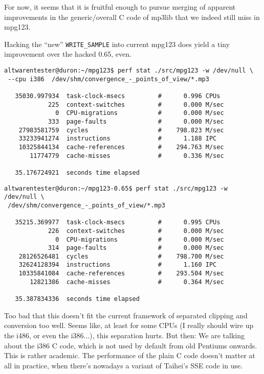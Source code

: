 \documentclass[a4paper,12pt]{scrartcl}
\begin{document}
For now, it seems that it is fruitful enough to pursue merging of apparent improvements in the generic/overall C code of mp3lib that we indeed still miss in mpg123.

Hacking the ``new'' \verb:WRITE_SAMPLE: into current mpg123 does yield a tiny improvement over the hacked 0.65, even.
\begin{verbatim}
altwarentester@duron:~/mpg123$ perf stat ./src/mpg123 -w /dev/null \
 --cpu i386  /dev/shm/convergence_-_points_of_view/*.mp3

   35030.997934  task-clock-msecs         #      0.996 CPUs
            225  context-switches         #      0.000 M/sec
              0  CPU-migrations           #      0.000 M/sec
            333  page-faults              #      0.000 M/sec
    27983581759  cycles                   #    798.823 M/sec
    33233941274  instructions             #      1.188 IPC
    10325844134  cache-references         #    294.763 M/sec
       11774779  cache-misses             #      0.336 M/sec
   
   35.176724921  seconds time elapsed
\end{verbatim}
\begin{verbatim}
altwarentester@duron:~/mpg123-0.65$ perf stat ./src/mpg123 -w /dev/null \
 /dev/shm/convergence_-_points_of_view/*.mp3

   35215.369977  task-clock-msecs         #      0.995 CPUs
            226  context-switches         #      0.000 M/sec
              0  CPU-migrations           #      0.000 M/sec
            314  page-faults              #      0.000 M/sec
    28126526481  cycles                   #    798.700 M/sec
    32624128394  instructions             #      1.160 IPC
    10335841084  cache-references         #    293.504 M/sec
       12821386  cache-misses             #      0.364 M/sec
   
   35.387834336  seconds time elapsed
\end{verbatim}
Too bad that this doesn't fit the current framework of separated clipping and conversion too well. Seems like, at least for some CPUs (I really should wire up the i486, or even the i386...), this separation hurts.
But then: We are talking about the i386 C code, which is not used by default from old Pentiums onwards. This is rather academic. The performance of the plain C code doesn't matter at all in practice, when there's nowadays a variant of Taihei's SSE code in use.
\end{document}
